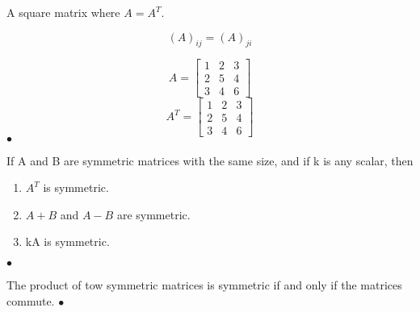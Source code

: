 \begin{definition}
	A square matrix where $A = A^{T}$.

	\[(A)_{ij} = (A)_{ji}\]
\end{definition}

\begin{example}
	\[A = \begin{bmatrix} 1 & 2 & 3 \\ 2 & 5 & 4 \\ 3 & 4 & 6 \end{bmatrix} \]
	\[A^{T} = \begin{bmatrix} 1 & 2 & 3 \\ 2 & 5 & 4 \\ 3 & 4 & 6 \end{bmatrix} \]
$\bullet$\end{example}

\begin{theorem}[]
	If A and B are symmetric matrices with the same size, and if k is any scalar,
	then
	\begin{enumerate}
		\item $A^{T}$ is symmetric.
			\item $A+B$ and $A-B$ are symmetric.
				\item kA is symmetric.
	\end{enumerate}
$\bullet$\end{theorem}

\begin{theorem}[]
	The product of tow symmetric matrices is symmetric if and only if the matrices commute.
 \smallskip\hfill$\bullet$\end{theorem}


\newpage


